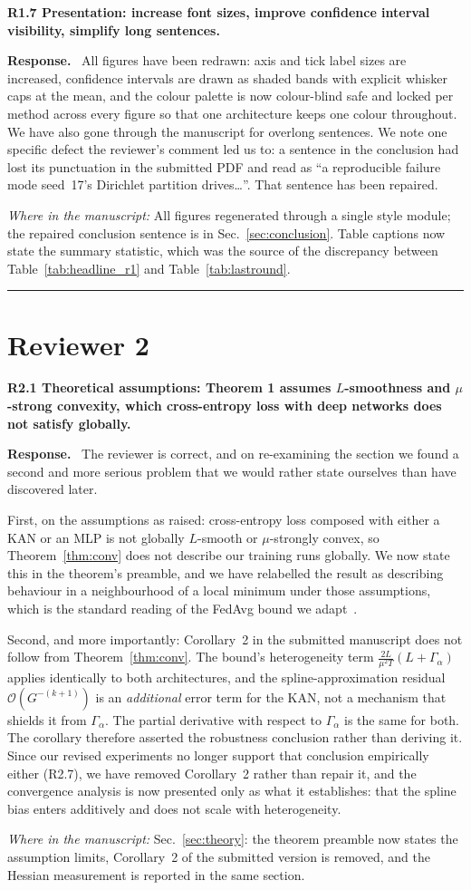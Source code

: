 \documentclass[11pt]{article}
\newcommand{\rc}[1]{\medskip\noindent\textbf{\textcolor[rgb]{0.35,0.35,0.35}{#1}}\par\nopagebreak}
\newcommand{\reply}{\medskip\noindent\textbf{Response.}\ }
\newcommand{\where}[1]{\par\smallskip\noindent\emph{Where in the manuscript:} #1\par}
\begin{document}
\rc{R1.7 Presentation: increase font sizes, improve confidence interval visibility,
simplify long sentences.}
\reply 
All figures have been redrawn: axis and tick label sizes are increased, confidence
intervals are drawn as shaded bands with explicit whisker caps at the mean, and the
colour palette is now colour-blind safe and locked per method across every figure so that
one architecture keeps one colour throughout. We have also gone through the manuscript for
overlong sentences. We note one specific defect the reviewer's comment led us to: a
sentence in the conclusion had lost its punctuation in the submitted PDF and read as
``a reproducible failure mode seed~17's Dirichlet partition drives\ldots''. That sentence
has been repaired.
\where{All figures regenerated through a single style module; the repaired conclusion sentence is in Sec.~\ref{sec:conclusion}. Table captions now state the summary statistic, which was the source of the discrepancy between Table~\ref{tab:headline_r1} and Table~\ref{tab:lastround}.}

\hrule
\section*{Reviewer 2}

\rc{R2.1 Theoretical assumptions: Theorem 1 assumes $L$-smoothness and $\mu$-strong
convexity, which cross-entropy loss with deep networks does not satisfy globally.}
\reply 
The reviewer is correct, and on re-examining the section we found a second and more
serious problem that we would rather state ourselves than have discovered later.

First, on the assumptions as raised: cross-entropy loss composed with either a KAN or an
MLP is not globally $L$-smooth or $\mu$-strongly convex, so Theorem~\ref{thm:conv} does
not describe our training runs globally. We now state this in the theorem's preamble, and
we have relabelled the result as describing behaviour in a neighbourhood of a local
minimum under those assumptions, which is the standard reading of the FedAvg bound we
adapt~\cite{li2020convergence}.

Second, and more importantly: Corollary~2 in the submitted manuscript does not follow from
Theorem~\ref{thm:conv}. The bound's heterogeneity term $\frac{2L}{\mu^2 T}(L+\Gamma_\alpha)$
applies identically to both architectures, and the spline-approximation residual
$\mathcal{O}(G^{-(k+1)})$ is an \emph{additional} error term for the KAN, not a mechanism
that shields it from $\Gamma_\alpha$. The partial derivative with respect to
$\Gamma_\alpha$ is the same for both. The corollary therefore asserted the robustness
conclusion rather than deriving it. Since our revised experiments no longer support that
conclusion empirically either (R2.7), we have removed Corollary~2 rather than repair it,
and the convergence analysis is now presented only as what it establishes: that the
spline bias enters additively and does not scale with heterogeneity.
\where{Sec.~\ref{sec:theory}: the theorem preamble now states the assumption limits, Corollary~2 of the submitted version is removed, and the Hessian measurement is reported in the same section.}
\end{document}
